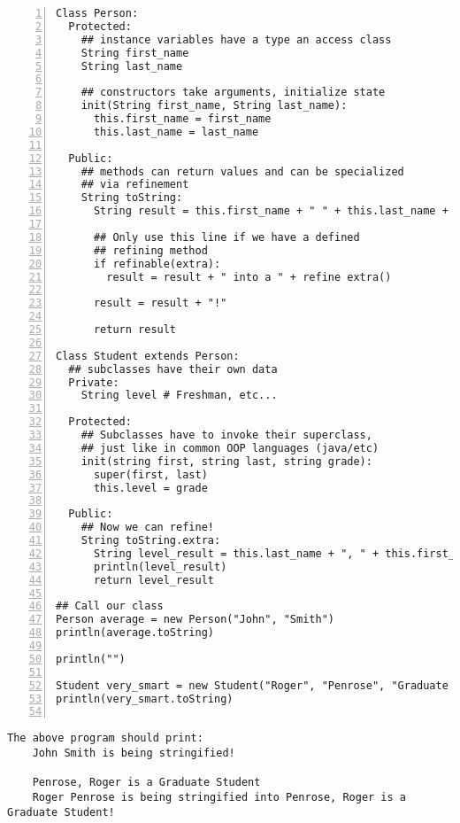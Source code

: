 \begin{lstlisting}[numbers=left,label=Personhood,caption=Personhood]
Class Person:
  Protected:
    ## instance variables have a type an access class
    String first_name
    String last_name

    ## constructors take arguments, initialize state
    init(String first_name, String last_name):
      this.first_name = first_name
      this.last_name = last_name

  Public:
    ## methods can return values and can be specialized
    ## via refinement
    String toString:
      String result = this.first_name + " " + this.last_name + " is being stringified"
      
      ## Only use this line if we have a defined
      ## refining method
      if refinable(extra):
        result = result + " into a " + refine extra()
      
      result = result + "!"
      
      return result

Class Student extends Person:
  ## subclasses have their own data
  Private:
    String level # Freshman, etc...

  Protected:
    ## Subclasses have to invoke their superclass,
    ## just like in common OOP languages (java/etc)
    init(string first, string last, string grade):
      super(first, last)
      this.level = grade

  Public:
    ## Now we can refine!
    String toString.extra:
      String level_result = this.last_name + ", " + this.first_name + " is a " + this.level
      println(level_result)
      return level_result

## Call our class
Person average = new Person("John", "Smith")
println(average.toString)

println("")

Student very_smart = new Student("Roger", "Penrose", "Graduate Student")
println(very_smart.toString)
  
\end{lstlisting}

\begin{verbatim}
The above program should print:
    John Smith is being stringified!

    Penrose, Roger is a Graduate Student
    Roger Penrose is being stringified into Penrose, Roger is a Graduate Student!
\end{verbatim}